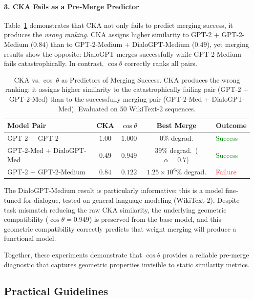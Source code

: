 \documentclass[10pt]{article} %
\theoremstyle{plain}
\theoremstyle{definition}
\theoremstyle{remark}
\begin{document}
\paragraph{3. CKA Fails as a Pre-Merge Predictor}
Table~\ref{tab:cka_comparison} demonstrates that CKA not only fails to predict merging success, it produces the \textit{wrong ranking}. CKA assigns higher similarity to GPT-2 + GPT-2-Medium ($0.84$) than to GPT-2-Medium + DialoGPT-Medium ($0.49$), yet merging results show the opposite: DialoGPT merges successfully while GPT-2-Medium fails catastrophically. In contrast, $\cos \theta$ correctly ranks all pairs.

\begin{table}[htbp]
\centering
\caption{CKA vs.~cos~$\theta$ as Predictors of Merging Success. CKA produces the wrong ranking: it assigns higher similarity to the catastrophically failing pair (GPT-2 + GPT-2-Med) than to the successfully merging pair (GPT-2-Med + DialoGPT-Med). Evaluated on 50 WikiText-2 sequences.}
\label{tab:cka_comparison}
\small
\begin{tabular}{l ccc l}
\toprule
\textbf{Model Pair} & \textbf{CKA} & \textbf{$\cos \theta$} & \textbf{Best Merge} & \textbf{Outcome} \\
\midrule
GPT-2 + GPT-2 & $1.00$ & $1.000$ & 0\% degrad. & \textcolor{green}{Success} \\
GPT-2-Med + DialoGPT-Med & $0.49$ & $0.949$ & 39\% degrad.~($\alpha{=}0.7$) & \textcolor{green}{Success} \\
GPT-2 + GPT-2-Medium & $\mathbf{0.84}$ & $0.122$ & $1.25{\times}10^6\%$ degrad. & \textcolor{red}{Failure} \\
\bottomrule
\end{tabular}
\end{table}

The DialoGPT-Medium result is particularly informative: this is a model fine-tuned for dialogue, tested on general language modeling (WikiText-2). Despite task mismatch reducing the raw CKA similarity, the underlying geometric compatibility ($\cos \theta = 0.949$) is preserved from the base model, and this geometric compatibility correctly predicts that weight merging will produce a functional model.

Together, these experiments demonstrate that $\cos \theta$ provides a reliable pre-merge diagnostic that captures geometric properties invisible to static similarity metrics.

\subsection{Practical Guidelines}
\end{document}
